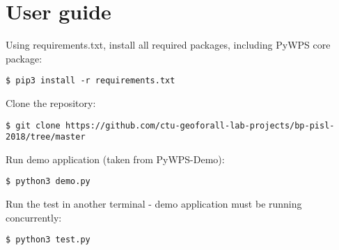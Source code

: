 \chapter{User guide}
\label{user-guide}


Using requirements.txt, install all required packages, including PyWPS core package: 
\begin{lstlisting}
$ pip3 install -r requirements.txt
\end{lstlisting}

Clone the repository:

\begin{lstlisting}
$ git clone https://github.com/ctu-geoforall-lab-projects/bp-pisl-2018/tree/master
\end{lstlisting}

Run demo application (taken from PyWPS-Demo):

\begin{lstlisting}
$ python3 demo.py
\end{lstlisting}

Run the test in another terminal - demo application must be running concurrently:

\begin{lstlisting}
$ python3 test.py
\end{lstlisting}






%
%
%
%
%




